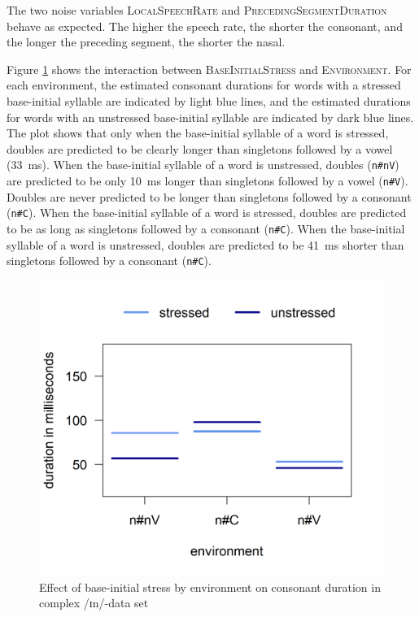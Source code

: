 The two noise variables \textsc{LocalSpeechRate} and \textsc{PrecedingSegmentDuration} behave as expected. The higher the speech rate, the shorter the consonant, and the longer the preceding segment, the shorter the nasal. 


Figure \ref{fig:Env Stress In experiment} shows the interaction between \textsc{BaseInitialStress} and \textsc{Environment}. For each environment, the estimated consonant durations for words with a stressed base-initial syllable are indicated by light blue lines, and the estimated durations for words with an unstressed base-initial syllable are indicated by dark blue lines. 
The plot shows that only when the base-initial syllable of a word is stressed, doubles are predicted to be clearly longer than singletons followed by a vowel (33~ms). When the base-initial syllable of a word is unstressed, doubles (\texttt{n\#nV}) are predicted to be only 10~ms longer than singletons followed by a vowel (\texttt{n\#V}).
Doubles are never predicted to be longer than singletons followed by a consonant  (\texttt{n\#C}).
When the base-initial syllable of a word is stressed, doubles are predicted to be as long as singletons followed by a consonant (\texttt{n\#C}). When the base-initial syllable of a word is unstressed, doubles are predicted to be 41~ms shorter than singletons followed by a consonant (\texttt{n\#C}).




 	\begin{figure}[t!]

 		\centering
 		\includegraphics [scale=0.5] {images/Experiment/InModelInterEnvStress}
		
 		\caption{Effect of base-initial stress by environment on consonant duration in complex /ɪn/-data set}		
 		\label{fig:Env Stress In experiment}

 	\end{figure}%
 	
